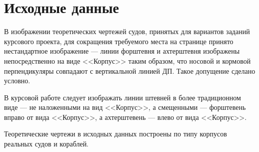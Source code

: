 \chapter{Исходные данные}

В изображении теоретических чертежей судов, принятых для вариантов заданий курсового проекта, для сокращения требуемого места на странице принято нестандартное изображение --- линии форштевня и ахтерштевня изображены непосредственно на виде <<Корпус>> таким образом, что носовой и кормовой перпендикуляры совпадают с вертикальной линией ДП.
Такое допущение сделано условно.

В курсовой работе следует изображать линии штевней в более традиционном виде --- не наложенными на вид <<Корпус>>, а смещенными --- форштевень вправо от вида <<Корпус>>, а ахтерштевень --- влево от вида <<Корпус>>.

Теоретические чертежи в исходных данных построены по типу корпусов реальных судов и кораблей.

\newpage

